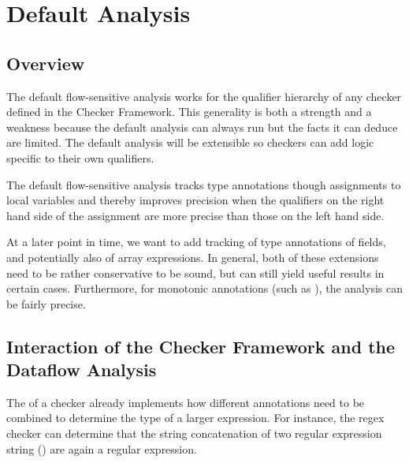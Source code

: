 


\section{Default Analysis}

\subsection{Overview}

The default flow-sensitive analysis works for the qualifier hierarchy of any checker defined in 
the Checker Framework.  This generality is both a strength and a weakness because the 
default analysis can
always run but the facts it can deduce are limited.  The default analysis
will be extensible so checkers can add logic specific to their own qualifiers.

The default flow-sensitive analysis tracks type annotations though assignments to local 
variables and thereby improves precision when the qualifiers on the right hand side of the
assignment are more precise than those on the left hand side.

\begin{workinprogress}
    At a later point in time, we want to add tracking of type annotations of fields, and
    potentially also of array expressions.  In general, both of these extensions need to be
    rather conservative to be sound, but can still yield useful results in certain cases.
    Furthermore, for monotonic annotations (such as ), the analysis can be
    fairly precise.
\end{workinprogress}



\subsection{Interaction of the Checker Framework and the Dataflow Analysis}
\label{sec:flow-cf-interaction}

The  of a checker already implements how different annotations
need to be combined to determine the type of a larger expression.  For instance,
the regex checker can determine that the string concatenation of two regular expression
string () are again a regular expression.

